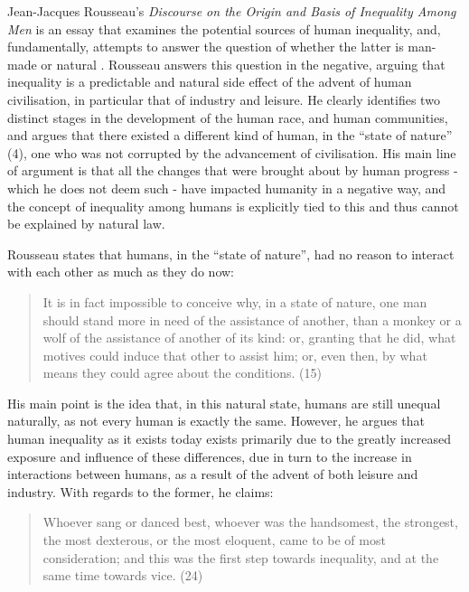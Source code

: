 

Jean-Jacques Rousseau's \textit{Discourse on the Origin and Basis of Inequality Among Men} is an essay that examines the potential sources of human inequality, and, fundamentally, attempts to answer the question of whether the latter is man-made or natural \cite{rousseau}. Rousseau answers this question in the negative, arguing that inequality is a predictable and natural side effect of the advent of human civilisation, in particular that of industry and leisure. He clearly identifies two distinct stages in the development of the human race, and human communities, and argues that there existed a different kind of human, in the ``state of nature'' (4), one who was not corrupted by the advancement of civilisation. His main line of argument is that all the changes that were brought about by human progress - which he does not deem such - have impacted humanity in a negative way, and the concept of inequality among humans is explicitly tied to this and thus cannot be explained by natural law.

Rousseau states that humans, in the ``state of nature'', had no reason to interact with each other as much as they do now:

\begin{quote}
  It is in fact impossible to conceive why, in a state of nature, one man should stand more in need of the assistance of another, than a monkey or a wolf of the assistance of another of its kind: or, granting that he did, what motives could induce that other to assist him; or, even then, by what means they could agree about the conditions. (15)
\end{quote}

His main point is the idea that, in this natural state, humans are still unequal naturally, as not every human is exactly the same. However, he argues that human inequality as it exists today exists primarily due to the greatly increased exposure and influence of these differences, due in turn to the increase in interactions between humans, as a result of the advent of both leisure and industry. With regards to the former, he claims:

\begin{quote}
  Whoever sang or danced best, whoever was the handsomest, the strongest, the most dexterous, or the most eloquent, came to be of most consideration; and this was the first step towards inequality, and at the same time towards vice. (24)
\end{quote}

